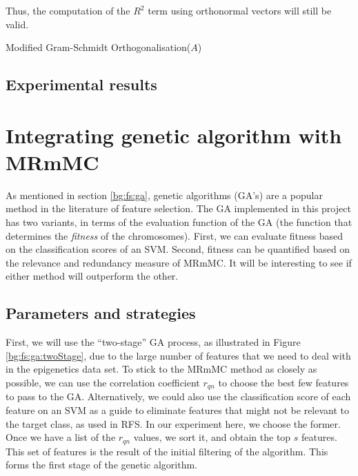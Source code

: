 \documentclass[12pt, twoside, a4paper]{report}
\begin{document}
Thus, the computation of the $R^2$ term using orthonormal vectors will still be valid.


\begin{algorithm}
\DontPrintSemicolon
{}
\BlankLine
{}
\caption{Modified Gram-Schmidt Orthogonalisation($A$) \label{MGS}}
\end{algorithm}

\subsection{Experimental results}


\section{Integrating genetic algorithm with MRmMC} \label{ga:mrmmc}

As mentioned in section \ref{bg:fs:ga}, genetic algorithms (GA's) are a popular method in the literature of feature selection. The GA implemented in this project has two variants, in terms of the evaluation function of the GA (the function that determines the \textit{fitness} of the chromosomes). First, we can evaluate fitness based on the classification scores of an SVM. Second, fitness can be quantified based on the relevance and redundancy measure of MRmMC. It will be interesting to see if either method will outperform the other.

\subsection{Parameters and strategies}
\label{body:ga:params}

First, we will use the ``two-stage'' GA process, as illustrated in Figure \ref{bg:fs:ga:twoStage}, due to the large number of features that we need to deal with in the epigenetics data set. To stick to the MRmMC method as closely as possible, we can use the correlation coefficient $r_{qn}$ to choose the best few features to pass to the GA. Alternatively, we could also use the classification score of each feature on an SVM as a guide to eliminate features that might not be relevant to the target class, as used in RFS. In our experiment here, we choose the former. Once we have a list of the $r_{qn}$ values, we sort it, and obtain the top $s$ features. This set of features is the result of the initial filtering of the algorithm. This forms the first stage of the genetic algorithm.
\end{document}
